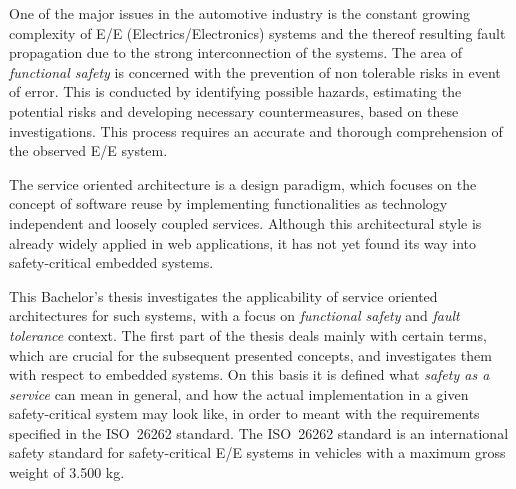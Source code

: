 One of the major issues in the automotive industry is the constant growing complexity of E/E (Electrics/Electronics) systems and the thereof resulting fault propagation due to the strong interconnection of the systems. The area of \emph{functional safety} is concerned with the prevention of non tolerable risks in event of error. This is conducted by identifying possible hazards, estimating the potential risks and developing necessary countermeasures, based on these investigations. This process requires an accurate and thorough comprehension of the observed E/E system.

The service oriented architecture is a design paradigm, which focuses on the concept of software reuse by implementing functionalities as technology independent and loosely coupled services. Although this architectural style is already widely applied in web applications, it has not yet found its way into safety-critical embedded systems.

This Bachelor's thesis investigates the applicability of service oriented architectures for such systems, with a focus on \emph{functional safety} and \emph{fault tolerance} context. The first part of the thesis deals mainly with certain terms, which are crucial for the subsequent presented concepts, and investigates them with respect to embedded systems. On this basis it is defined what \emph{safety as a service} can mean in general, and how the actual implementation in a given safety-critical system may look like, in order to meant with the requirements specified in the \mbox{ISO 26262} standard. The \mbox{ISO 26262} standard is an international safety standard for safety-critical E/E systems in vehicles with a maximum gross weight of 3.500 kg.
